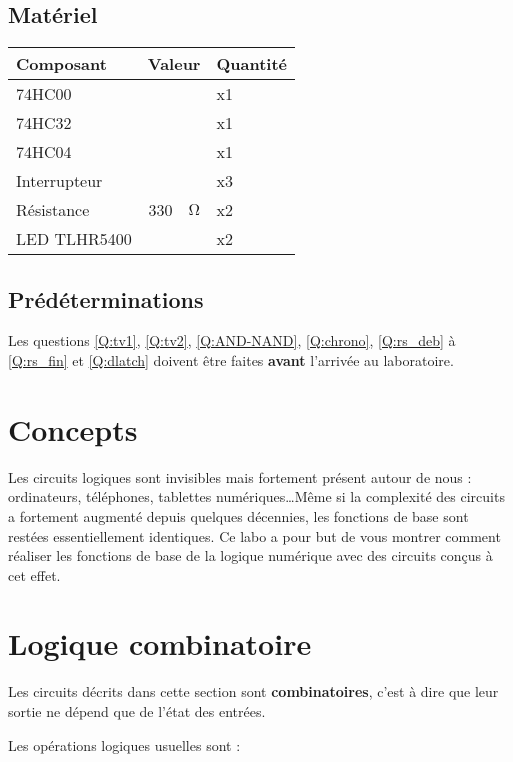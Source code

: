 \documentclass{../template/labo}
\begin{document}
\subsection{Matériel}

\begin{center}
	\begin{tabular}{p{}rlp{}}
		Composant & \multicolumn{2}{c}{Valeur} & Quantité \\\toprule
		\multirow{1}{*}{74HC00} &  & & x1 \\\midrule
		\multirow{1}{*}{74HC32} &  & & x1 \\\midrule
		\multirow{1}{*}{74HC04} &  & & x1 \\\midrule
		\multirow{1}{*}{Interrupteur} 	& & & x3 \\\midrule
		\multirow{1}{*}{Résistance} 	& 330 & $\si{\ohm}$ & x2 \\\midrule
		LED TLHR5400 & & & x2 \\\bottomrule
	\end{tabular}
	\end{center}

\subsection{Prédéterminations}
Les questions \ref{Q:tv1}, \ref{Q:tv2}, \ref{Q:AND-NAND}, \ref{Q:chrono}, \ref{Q:rs_deb} à \ref{Q:rs_fin} et \ref{Q:dlatch} doivent être faites \textbf{avant} l'arrivée au laboratoire.

\section{Concepts}

\begin{info}
Les circuits logiques sont invisibles mais fortement présent autour de nous : ordinateurs, téléphones, tablettes numériques\dots Même si la complexité des circuits a fortement augmenté depuis quelques décennies, les fonctions de base sont restées essentiellement identiques. Ce labo a pour but de vous montrer comment réaliser les fonctions de base de la logique numérique avec des circuits conçus à cet effet.
\end{info}

\section{Logique combinatoire}

\begin{info}
Les circuits décrits dans cette section sont \textbf{combinatoires}, c'est à dire que leur sortie ne dépend que de l'état des entrées.

Les opérations logiques usuelles sont :
\end{info}
\end{document}
